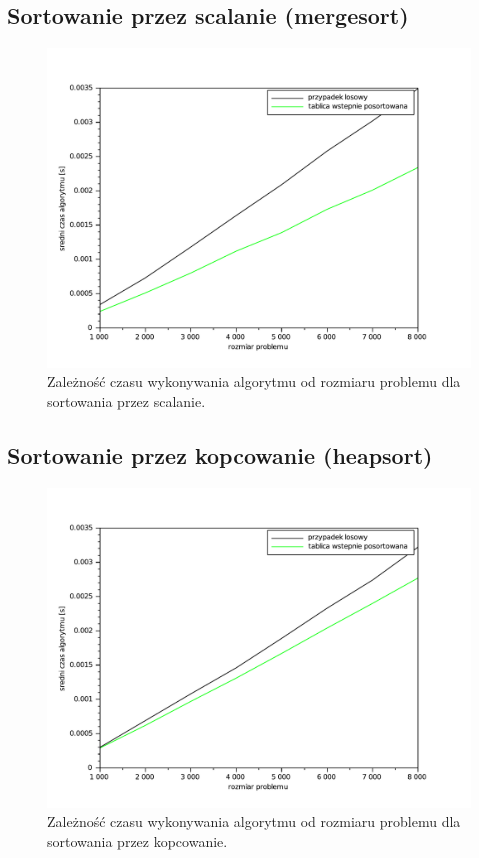 \documentclass{mwart}
\begin{document}
\subsection {Sortowanie przez scalanie (mergesort)}
\begin{figure}[!htp]
\centering
\includegraphics[width=\textwidth]{files/merge.pdf}
\caption{Zależność czasu wykonywania algorytmu od rozmiaru problemu dla sortowania przez scalanie. \label{merge}} 
\end{figure}


\newpage
\subsection {Sortowanie przez kopcowanie (heapsort)}
\begin{figure}[!htp]
\centering
\includegraphics[width=\textwidth]{files/heap.pdf}
\caption{Zależność czasu wykonywania algorytmu od rozmiaru problemu dla sortowania przez kopcowanie. \label{heap}} 
\end{figure}
\end{document}
